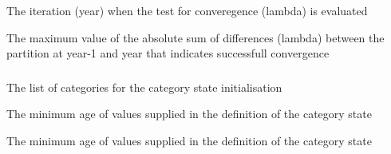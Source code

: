 {The iteration (year) when the test for converegence (lambda) is evaluated}

 {The maximum value of the absolute sum of differences (lambda) between the partition at year-1 and year that indicates successfull convergence}

\subsubsection[State Category By Age]{}

 {The list of categories for the category state initialisation}

 {The minimum age of values supplied in the definition of the category state}

 {The minimum age of values supplied in the definition of the category state}

